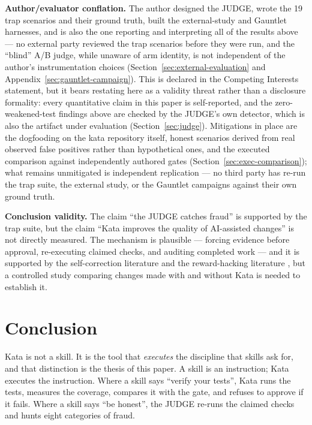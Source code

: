 \documentclass{sbc2019}%
\begin{document}
\textbf{Author/evaluator conflation.} The author designed the JUDGE, wrote
the 19 trap scenarios and their ground truth, built the external-study and
Gauntlet harnesses, and is also the one reporting and interpreting all of
the results above --- no external party reviewed the trap scenarios before
they were run, and the ``blind'' A/B judge, while unaware of arm identity,
is not independent of the author's instrumentation choices (Section~\ref{sec:external-evaluation} and
Appendix~\ref{sec:gauntlet-campaign}). This is
declared in the Competing Interests statement, but it bears restating here
as a validity threat rather than a disclosure formality: every quantitative
claim in this paper is self-reported, and the zero-weakened-test findings
above are checked by the JUDGE's own detector, which is also the artifact
under evaluation (Section~\ref{sec:judge}). Mitigations in place are the
dogfooding on the kata repository itself, honest scenarios derived from real
observed false positives rather than hypothetical ones, and the executed
comparison against independently authored gates (Section~\ref{sec:exec-comparison});
what remains unmitigated is independent replication --- no third party has
re-run the trap suite, the external study, or the Gauntlet campaigns against
their own ground truth.

\textbf{Conclusion validity.} The claim ``the JUDGE catches fraud'' is
supported by the trap suite, but the claim ``Kata improves the quality of
AI-assisted changes'' is not directly measured. The mechanism is
plausible --- forcing evidence before approval, re-executing claimed
checks, and auditing completed work --- and it is supported by the
self-correction literature \cite{selfcorrect} and the reward-hacking
literature \cite{specbench}, but a controlled study comparing changes made
with and without Kata is needed to establish it.

\section{Conclusion}
\label{sec:conclusion}

Kata is not a skill. It is the tool that \emph{executes} the discipline that
skills ask for, and that distinction is the thesis of this paper. A skill is
an instruction; Kata executes the instruction. Where a skill
says ``verify your tests'', Kata runs the tests, measures the coverage,
compares it with the gate, and refuses to approve if it fails. Where a skill
says ``be honest'', the JUDGE re-runs the claimed checks and hunts eight
categories of fraud.
\end{document}
